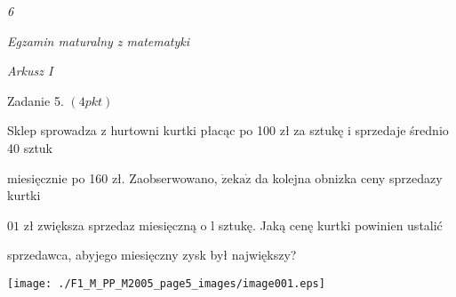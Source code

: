 \documentclass[a4paper,12pt]{article}
\begin{document}
{\it 6}

{\it Egzamin maturalny z matematyki}

{\it Arkusz I}

Zadanie 5. $(4pkt)$

Sklep sprowadza z hurtowni kurtki płacąc po 100 zł za sztukę i sprzedaje średnio 40 sztuk

miesięcznie po 160 zł. Zaobserwowano, $\dot{\mathrm{z}}\mathrm{e} \mathrm{k}\mathrm{a}\dot{\mathrm{z}}$ da kolejna obnizka ceny sprzedaz$\mathrm{y}$ kurtki

$01$ zł zwiększa sprzedaz miesięczną o l sztukę. Jaką cenę kurtki powinien ustalić

sprzedawca, abyjego miesięczny zysk był największy?
\begin{center}
\texttt{[image: ./F1\_M\_PP\_M2005\_page5\_images/image001.eps]}
\end{center}
\end{document}
